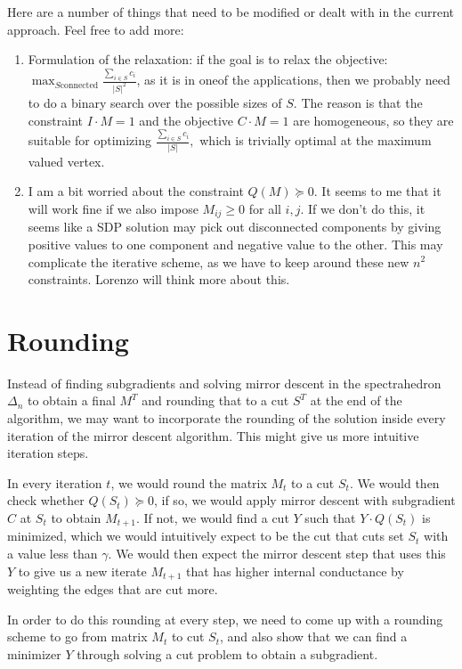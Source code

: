 \documentclass{article}
\begin{document}
Here are a number of things that need to be modified or dealt with in the current approach. Feel free to add more:
\begin{enumerate}
\item Formulation of the relaxation: if the goal is to relax the objective: $\max_{S \textrm{connected}} \frac{\sum_{i \in S} c_i}{|S|^2}$, as it is in oneof the applications, then we probably need to do a binary search over the possible sizes of $S.$ The reason is that the constraint $I \cdot M = 1$ and the objective $C \cdot M = 1$ are homogeneous, so they are suitable for optimizing $\frac{\sum_{i \in S} c_i}{|S|},$ which is trivially optimal at the maximum valued vertex.
\item I am a bit worried about the constraint $Q(M) \succeq 0.$ It seems to me that it will work fine if we also impose $M_{ij} \geq 0$ for all $i,j.$  If we don't do this, it seems like a SDP solution may pick out disconnected components by giving positive values to one component and negative value to the other. This may complicate the iterative scheme, as we have to keep around these new $n^2$ constraints. Lorenzo will think more about this.
\end{enumerate}



\section{Rounding}

Instead of finding subgradients and solving mirror descent in the spectrahedron $\Delta_n$ to obtain a final $M^T$ and rounding that to a cut $S^T$ at the end of the algorithm, we may want to incorporate the rounding of the solution inside every iteration of the mirror descent algorithm. This might give us more intuitive iteration steps.

In every iteration $t$, we would round the matrix $M_t$ to a cut $S_t$. We would then check whether $Q(S_t) \succeq 0$, if so, we would apply mirror descent with subgradient $C$ at $S_t$ to obtain $M_{t+1}$. If not, we would find a cut $Y$ such that $Y \cdot Q(S_t)$ is minimized, which we would intuitively expect to be the cut that cuts set $S_t$ with a value less than $\gamma$. We would then expect the mirror descent step that uses this $Y$ to give us a new iterate $M_{t+1}$ that has higher internal conductance by weighting the edges that are cut more.

In order to do this rounding at every step, we need to come up with a rounding scheme to go from matrix $M_t$ to cut $S_t$, and also show that we can find a minimizer $Y$ through solving a cut problem to obtain a subgradient.
\end{document}
